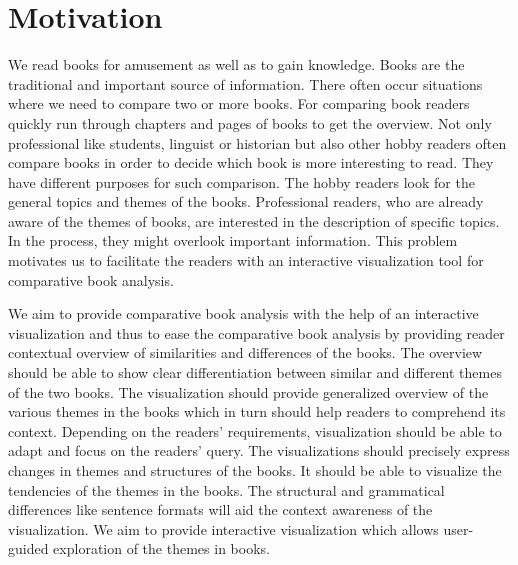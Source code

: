 \chapter{Motivation}
\label{motivation}

We read books for amusement as well as to gain knowledge. Books are the traditional and important source of information. There often occur situations where we need to compare two or more books. For comparing book readers quickly run through chapters and pages of books to get the overview. Not only professional like students, linguist or historian but also other hobby readers often compare books in order to decide which book is more interesting to read. They have different purposes for such comparison. The hobby readers look for the general topics and themes of the books. Professional readers, who are already aware of the themes of books, are interested in the description of specific topics. In the process, they might overlook important information. This problem motivates us to facilitate the readers with an interactive visualization tool for comparative book analysis.

We aim to provide comparative book analysis with the help of an interactive visualization and thus to ease the comparative book analysis by providing reader contextual overview of similarities and differences of the books. The overview should be able to show clear differentiation between similar and different themes of the two books. The visualization should provide generalized overview of the various themes in the books which in turn should help readers to comprehend its context. Depending on the readers’ requirements, visualization should be able to adapt and focus on the readers’ query. The visualizations should precisely express changes in themes and structures of the books. It should be able to visualize the tendencies of the themes in the books. The structural and grammatical differences like sentence formats will aid the context awareness of the visualization. We aim to provide interactive visualization which allows user-guided exploration of the themes in books.